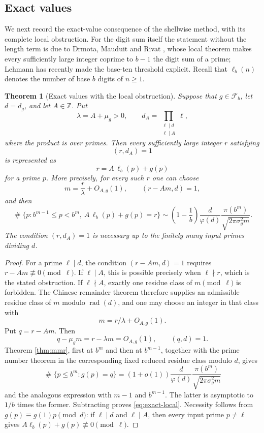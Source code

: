 \documentclass[11pt,reqno]{amsart}
\theoremstyle{plain}
\newtheorem{theorem}{Theorem}[section]
\theoremstyle{definition}
\newcommand{\Z}{\mathbb{Z}}
\newcommand{\1}{\mathbf 1}
\newcommand{\ellb}{\ell_b}
\DeclareMathOperator{\Card}{\#}
\DeclareMathOperator{\rad}{rad}
\begin{document}
\subsection{Exact values}

We next record the exact-value consequence of the shellwise method, with its complete local obstruction.  For the digit sum itself the statement without the length term is due to Drmota, Mauduit and Rivat \cite{dmr2009}, whose local theorem makes every sufficiently large integer coprime to $b-1$ the digit sum of a prime; Lehmann \cite{lehmann} has recently made the base-ten threshold explicit.  Recall that $\ellb(n)$ denotes the number of base $b$ digits of $n\ge1$.

\begin{theorem}[Exact values with the local obstruction]\label{thm:length-intro}
Suppose that $g\in\mathcal F_b$, let $d=d_g$, and let $A\in\Z$.  Put
\[
 \lambda=A+\mu_g>0,
 \qquad
 d_A=\prod_{\substack{\ell\mid d\\\ell\mid A}}\ell,
\]
where the product is over primes.  Then every sufficiently large integer $r$ satisfying
\[
 (r,d_A)=1
\]
is represented as
\[
 r=A\,\ellb(p)+g(p)
\]
for a prime $p$.  More precisely, for every such $r$ one can choose
\[
 m=\frac r\lambda+O_{A,g}(1),\qquad (r-Am,d)=1,
\]
and then
\begin{equation}\label{eq:exact-local}
 \Card\{p:b^{m-1}\le p<b^m,\ A\,\ellb(p)+g(p)=r\}
 \sim \left(1-\frac1b\right)\frac d{\varphi(d)}
 \frac{\pi(b^m)}{\sqrt{2\pi\sigma_g^2m}}.
\end{equation}
The condition $(r,d_A)=1$ is necessary up to the finitely many input primes dividing $d$.
\end{theorem}

\begin{proof}
For a prime $\ell\mid d$, the condition
$(r-Am,d)=1$
requires $r-Am\not\equiv0\pmod\ell$.  If $\ell\mid A$, this is possible precisely when $\ell\nmid r$, which is the stated obstruction.  If $\ell\nmid A$, exactly one residue class of $m\pmod\ell$ is forbidden.  The Chinese remainder theorem therefore supplies an admissible residue class of $m$ modulo $\rad(d)$, and one may choose an integer in that class with
\[
 m=r/\lambda+O_{A,g}(1).
\]
Put $q=r-Am$.  Then
\[
 q-\mu_gm=r-\lambda m=O_{A,g}(1),
 \qquad (q,d)=1.
\]
Theorem \ref{thm:mmr}, first at $b^m$ and then at $b^{m-1}$, together with the prime number theorem in the corresponding fixed reduced residue class modulo $d$, gives
\[
 \Card\{p\le b^m:g(p)=q\}
 =(1+o(1))\frac d{\varphi(d)}
 \frac{\pi(b^m)}{\sqrt{2\pi\sigma_g^2m}}
\]
and the analogous expression with $m-1$ and $b^{m-1}$.  The latter is asymptotic to $1/b$ times the former.  Subtracting proves \eqref{eq:exact-local}.  Necessity follows from $g(p)\equiv g(1)p\pmod d$: if $\ell\mid d$ and $\ell\mid A$, then every input prime $p\ne\ell$ gives $A\ellb(p)+g(p)\not\equiv0\pmod\ell$.
\end{proof}
\end{document}
